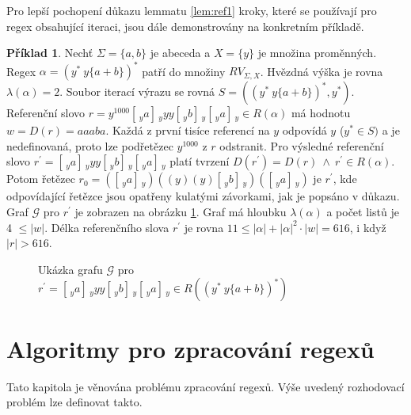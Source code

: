 \documentclass[thesis=B,czech]{FITthesis}[2019/12/23]
\theoremstyle{definition}
\newtheorem{example}{Příklad}[chapter]
\begin{document}
Pro lepší pochopení důkazu lemmatu \ref{lem:ref1} kroky, které se používají pro regex obsahující iteraci, jsou dále demonstrovány na konkretním příkladě.
 
\begin{example}
Nechť $\Sigma = \{a, b\}$ je abeceda a $X=\{y\}$ je množina proměnných. Regex $\alpha = (y^\ast \ y \{a+b\})^\ast$ patří do množiny $RV_{\Sigma, X}$. Hvězdná výška je rovna $\lambda(\alpha) = 2$. Soubor iterací výrazu se rovná $S = \left((y^\ast \ y \{a+b\})^\ast, y^\ast\right)$. Referenční slovo $r = y^{1000} [\,_y a ]\,_y y y [\,_y b ]\,_y [\,_y a ]\,_y \in R(\alpha)$ má hodnotu $w=D(r)=aaaba$. Každá z první tisíce referencí na $y$ odpovídá $y$ ($y^\ast \in S)$ a je nedefinovaná, proto lze podřetězec $y^{1000}$ z $r$ odstranit. Pro výsledné referenční slovo $r^\prime = [\,_y a ]\,_y y y [\,_y b ]\,_y [\,_y a ]\,_y$ platí tvrzení $D(r^\prime)=D(r) \ \wedge \ r^\prime \in R(\alpha)$. Potom řetězec $r_0 = ([\,_y a ]\,_y) ((y) (y) [\,_y b ]\,_y) ([\,_y a ]\,_y)$ je $r^\prime$, kde odpovídající řetězce jsou opatřeny kulatými závorkami, jak je popsáno v důkazu. Graf $\mathcal{G}$ pro $r^\prime$ je zobrazen na obrázku \ref{fig:refproof}. Graf má hloubku $\lambda(\alpha)$ a počet listů je 4 $\le |w|$. Délka referenčního slova $r^\prime$ je rovna $11 \le |\alpha| + |\alpha|^2\cdot|w|=616$, i když $|r| > 616$. 
\end{example}

\begin{figure}[h]
\centering

\caption{Ukázka grafu $\mathcal{G}$ pro $r^\prime=[\,_y a ]\,_y y y [\,_y b ]\,_y [\,_y a ]\,_y \in R((y^\ast \ y\{a+b\})^\ast)$}\label{fig:refproof}
\end{figure}

\chapter{Algoritmy pro zpracování regexů}
Tato kapitola je věnována problému zpracování regexů. Výše uvedený rozhodovací problém lze definovat takto.
\end{document}
